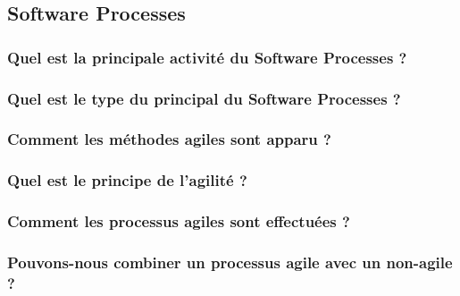 \subsection{Software Processes}

\subsubsection{Quel est la principale activité du Software Processes ?}
\subsubsection{Quel est le type du principal du Software Processes ?}
\subsubsection{Comment les méthodes agiles sont apparu ?}
\subsubsection{Quel est le principe de l'agilité ?}
\subsubsection{Comment les processus agiles sont effectuées ?}
\subsubsection{Pouvons-nous combiner un processus agile avec un non-agile ?}
